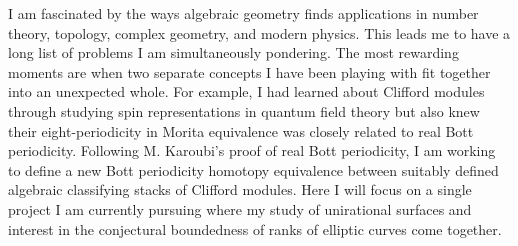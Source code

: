 \documentclass[11pt]{article}
\begin{document}


\pagestyle{fancy}
\setlength{\headheight}{15pt}
\setlength{\headsep}{0.2in}

I am fascinated by the ways algebraic geometry finds applications in number theory, topology, complex geometry, and modern physics. This leads me to have a long list of problems I am simultaneously pondering. The most rewarding moments are when two separate concepts I have been playing with fit together into an unexpected whole. For example, I had learned about Clifford modules through studying spin representations in quantum field theory but also knew their eight-periodicity in Morita equivalence was closely related to real Bott periodicity. Following M. Karoubi's proof of real Bott periodicity, I am working to define a new Bott periodicity homotopy equivalence between suitably defined algebraic classifying stacks of Clifford modules. Here I will focus on a single project I am currently pursuing where my study of unirational surfaces and interest in the conjectural boundedness of ranks of elliptic curves come together. 
\end{document}
